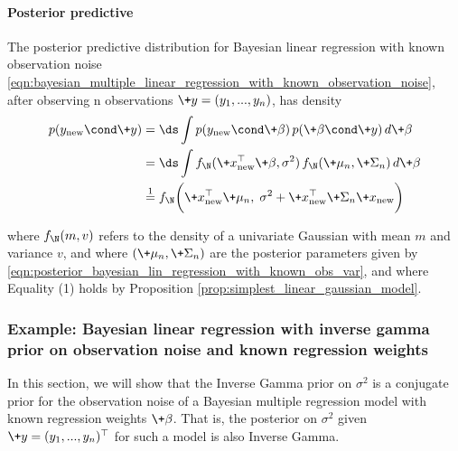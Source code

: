 \documentclass{article} %
\newcommand{\new}{\text{new}}
\begin{document}
\paragraph{Posterior predictive}

The posterior predictive distribution for Bayesian linear regression with known observation noise \eqref{eqn:bayesian_multiple_linear_regression_with_known_observation_noise},   after observing n observations $\+y =(y_1, ..., y_n)$,   has density
\begin{align*}
p(y_\new \cond \+y) &= \ds\int  p(y_\new \cond \+\beta) \, p(\+\beta \cond \+y) \, d\+\beta \\
&= \ds\int f_\N(\+x_\new^\top \+\beta,  \sigma^2) \,  f_\N(\+\mu_n,  \+\Sigma_n)  \,  d\+\beta \\
& \stackrel{1}{=} f_\N \bigg( \+x_\new^\top \+\mu_n,  \;  \sigma^2 + \+x_\new^\top \+\Sigma_n  \+x_\new \bigg) 
\end{align*}

where $f_\N(m,v)$ refers to the density of a univariate Gaussian with mean $m$ and variance $v$, and where $(\+\mu_n, \+\Sigma_n)$ are the posterior parameters given by \eqref{eqn:posterior_bayesian_lin_regression_with_known_obs_var},  and where Equality (1) holds by Proposition \ref{prop:simplest_linear_gaussian_model}.


\subsubsection{Example:  Bayesian linear regression with inverse gamma prior on observation noise and known regression weights} \label{sec:Bayesian_linear_regression_with_IG_prior}


In this section,  we will show that the Inverse Gamma prior on $\sigma^2$ is a conjugate prior for the observation noise of a Bayesian multiple regression model with known regression weights  $\+\beta$.  That is,  the posterior on $\sigma^2$ given $\+y = (y_1,...,y_n)^\top$ for such a model is also Inverse Gamma. 
\end{document}
